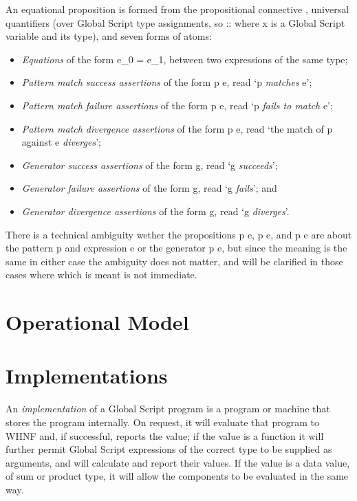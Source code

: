 \documentclass{report}
\newcommand\match\propto
\newcommand\defn[1]{\emph{#1}}
\begin{document}
An equational proposition is formed from the propositional connective \<\land\>,
universal quantifiers \<\forall\>
(over Global Script type assignments, so \<\forall {} :: \tau\> where \<x\> is a Global Script variable and \<\tau\> its type),
and seven forms of atoms:
\begin{itemize}
    \item \defn{Equations} of the form \<e_0 = e_1\>, between two expressions of the same type;
    \item \defn{Pattern match success assertions} of the form \<p \match e\>, read `\<p\> \defn{matches} \<e\>';
    \item \defn{Pattern match failure  assertions} of the form \<p \match e\fails\>, read `\<p\> \defn{fails to match} \<e\>';
    \item \defn{Pattern match divergence assertions} of the form \<p \match e\diverges\>, read `the match of \<p\> against \<e\> \defn{diverges}';
    \item \defn{Generator success assertions} of the form \<g\>, read `\<g\> \defn{succeeds}';
    \item \defn{Generator failure assertions} of the form \<g\fails\>, read `\<g\> \defn{fails}'; and
    \item \defn{Generator divergence assertions} of the form \<g\diverges\>, read `\<g\> \defn{diverges}'.
\end{itemize}
There is a technical ambiguity wether the propositions \<p \match e\>, \<p \match e\fails\>, and \<p \match e\diverges\>
are about the pattern \<p\> and expression \<e\> or the generator \<p \match e\>,
but since the meaning is the same in either case the ambiguity does not matter,
and will be clarified in those cases where which is meant is not immediate.

\section{Operational Model}

\section{Implementations}

An \defn{implementation} of a Global Script program is a program or machine that stores the program internally.
On request, it will evaluate that program to WHNF and, if successful, reports the value;
if the value is a function it will further permit Global Script expressions of the correct type to be supplied as arguments,
and will calculate and report their values.
If the value is a data value, of sum or product type, it will allow the components to be evaluated in the same way.
\end{document}
